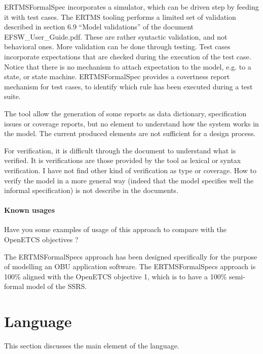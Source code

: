 \begin{assessor1}
ERTMSFormalSpec incorporates a simulator, which can be driven step by feeding it with test cases. 
The ERTMS tooling performs a limited set of validation described in section 6.9 "`Model validations"' of the document EFSW\_User\_Guide.pdf. These are rather syntactic validation, and not behavioral ones. More validation can be done through testing. Test cases incorporate expectations that are checked during the execution of the test case. Notice that there is no mechanism to attach expectation to the model, e.g. to a state, or state machine. ERTMSFormalSpec provides a covertness report mechanism for test cases, to identify which rule has been executed during a test suite. 
\end{assessor1}

\begin{assessor2}
The tool allow the generation of some reports as data dictionary, specification issues or coverage reports, but no element to understand how the system works in the model. The current produced elements are not sufficient for a design process.

For verification, it is difficult through the document to understand what is verified. It is verifications are those provided by the tool as lexical or syntax verification. I have not find other kind of verification as type or coverage. How to verify the model in a more general way (indeed that the model specifies well the informal specification) is not describe in the documents.
\end{assessor2}


\paragraph{Known usages} Have you some examples of usage of this approach to compare with the OpenETCS objectives ?

\begin{author_comment}
The ERTMSFormalSpecs approach has been designed specifically for the purpose of modelling an OBU application software. The ERTMSFormalSpecs approach is 100\% aligned with the OpenETCS objective 1, which is to have a 100\% semi-formal model of the SSRS. 
\end{author_comment}

\section{Language}
This section discusses the main element of the language.

